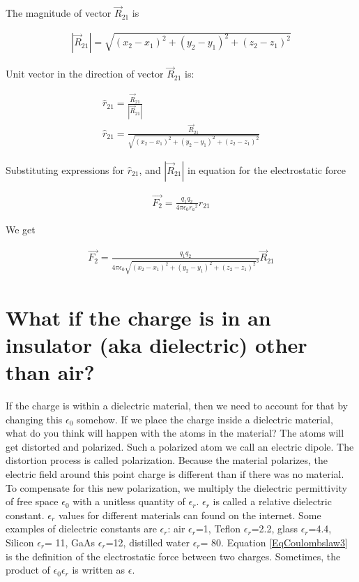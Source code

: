 \documentclass{ximera}
\begin{document}
\begin{example}
\begin{explanation}
The magnitude of vector $\vec{R}_{21}$ is


\begin{eqnarray}
|\vec{R}_{21}|= \sqrt{(x_2 - x_1)^2 +(y_2 - y_1)^2 +(z_2 - z_1)^2}
\end{eqnarray}

Unit vector in the direction of vector $\vec{R}_{21}$ is:


\begin{eqnarray}
\hat{r}_{21}= \frac{\vec{R}_{21}}{|\vec{R}_{21}|} \\
\hat{r}_{21}=\frac{\vec{R}_{21}}{\sqrt{(x_2 - x_1)^2 +(y_2 - y_1)^2 +(z_2 - z_1)^2}}
\end{eqnarray}

Substituting expressions for $\hat{r}_{21}$, and $|\vec{R}_{21}|$ in equation for the electrostatic force 

\begin{eqnarray}
\vec{F_2}=\frac{q_1 q_2}{4 \pi \epsilon_{0} {r_a}^2} \hat{r}_{21}
\end{eqnarray}

 

 
We get


\begin{eqnarray}
\vec{F_2}=\frac{q_1 q_2}{4 \pi \epsilon_{0} {\sqrt{(x_2 - x_1)^2 +(y_2 - y_1)^2 +(z_2 - z_1)^2}
}^3} \vec{R}_{21} \label{eqonecharge}
\end{eqnarray}







\end{explanation}


\end{example}




\section{What if the charge is in an insulator (aka dielectric) other than air?} 

If the charge is within a dielectric material, then we need to account for that by changing this $\epsilon_0$ somehow. If we place the charge inside a dielectric material, what do you think will happen with the atoms in the material? The atoms will get distorted and polarized. Such a polarized atom we call an electric dipole. The distortion process is called polarization. Because the material polarizes, the electric field around this point charge is different than if there was no material. To compensate for this new polarization, we multiply the dielectric permittivity of free space $\epsilon_0$ with a unitless quantity of $\epsilon_r$.  $\epsilon_r$ is called a relative dielectric constant. $\epsilon_r$ values for different materials can found on the internet. Some examples of dielectric constants are $\epsilon_r$: air $\epsilon_r$=1,  Teflon $\epsilon_r$=2.2, glass $\epsilon_r$=4.4, Silicon $\epsilon_r$= 11, GaAs $\epsilon_r$=12, distilled water $\epsilon_r$= 80.  Equation \ref{EqCoulombslaw3} is the definition of the electrostatic force between two charges. Sometimes, the product of $\epsilon_0 \epsilon_r$ is written as $\epsilon$.
\end{document}
